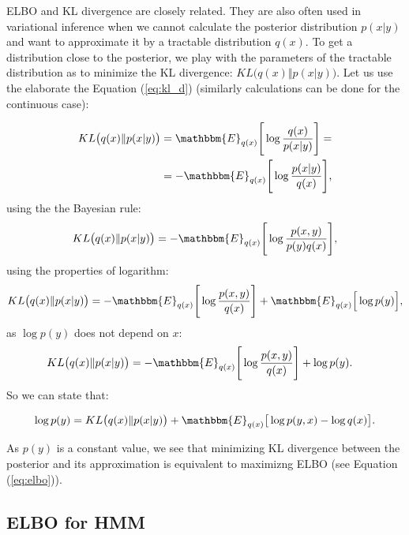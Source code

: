\documentclass[shortabstract]{iithesis}
\begin{document}
ELBO and KL divergence are closely related. They are also often used in variational inference when we cannot calculate the posterior distribution $p(x | y)$ and want to approximate it by a tractable distribution $q(x)$.
To get a distribution close to the posterior, we play with the parameters of the tractable distribution as to minimize the KL divergence: $KL\big(q(x) \Vert p(x | y)\big)$. Let us use the elaborate the Equation (\ref{eq:kl_d}) (similarly calculations can be done for the continuous case):

\begin{equation*}
\begin{aligned}
    KL\big(q(x) \Vert p(x | y)\big) & = \mathbbm{E}_{q(x)} \Bigg[ \log \frac{q(x)}{p(x|y)} \Bigg] = \\
    & = - \mathbbm{E}_{q(x)} \Bigg[ \log \frac{p(x|y)}{q(x)} \Bigg] \text{,}
\end{aligned}
\end{equation*}
using the the Bayesian rule:
\begin{equation*}
    KL\big(q(x) \Vert p(x | y)\big) = - \mathbbm{E}_{q(x)} \Bigg[ \log \frac{p(x, y)}{p(y) q(x)} \Bigg] \text{,}
\end{equation*} 
using the properties of logarithm:
\begin{equation*}
    KL\big(q(x) \Vert p(x | y)\big) = - \mathbbm{E}_{q(x)} \Bigg[ \log \frac{p(x, y)}{q(x)} \Bigg] +  \mathbbm{E}_{q(x)} \Big[ \log p(y) \Big] \text{,} \\
\end{equation*}
as $\log p(y)$ does not depend on $x$:
\begin{equation*}
\begin{aligned}
    KL\big(q(x) \Vert p(x | y)\big) & = - \mathbbm{E}_{q(x)} \Bigg[ \log \frac{p(x, y)}{q(x)} \Bigg] +  \log p(y)  \text{.}
\end{aligned}
\end{equation*}
\linebreak
So we can state that:

\begin{equation*}
    \log p(y) = KL\big(q(x) \Vert p(x | y)\big) + \mathbbm{E}_{q(x)}  \big[\log p(y, x) -  \log q(x)\big]\text{.}
\end{equation*}

As $p(y)$ is a constant value, we see that minimizing KL divergence between the posterior and its approximation is equivalent to maximizng ELBO (see Equation (\ref{eq:elbo})). 

\subsection{ELBO for HMM}
\end{document}
